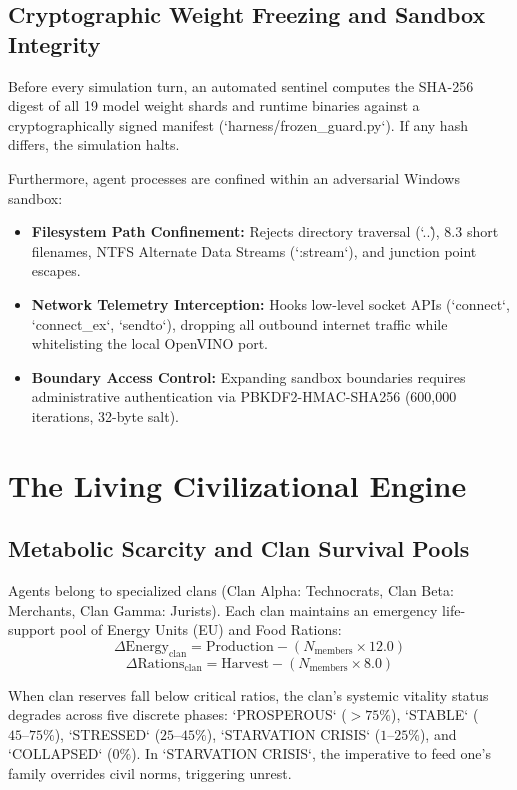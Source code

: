 \documentclass[11pt,a4paper]{article}
\begin{document}
\subsection{Cryptographic Weight Freezing and Sandbox Integrity}
Before every simulation turn, an automated sentinel computes the SHA-256 digest of all 19 model weight shards and runtime binaries against a cryptographically signed manifest (`harness/frozen_guard.py`). If any hash differs, the simulation halts. 

Furthermore, agent processes are confined within an adversarial Windows sandbox:
\begin{itemize}[leftmargin=*]
    \item \textbf{Filesystem Path Confinement:} Rejects directory traversal (`..\`), 8.3 short filenames, NTFS Alternate Data Streams (`:stream`), and junction point escapes.
    \item \textbf{Network Telemetry Interception:} Hooks low-level socket APIs (`connect`, `connect_ex`, `sendto`), dropping all outbound internet traffic while whitelisting the local OpenVINO port.
    \item \textbf{Boundary Access Control:} Expanding sandbox boundaries requires administrative authentication via PBKDF2-HMAC-SHA256 (600,000 iterations, 32-byte salt).
\end{itemize}

\section{The Living Civilizational Engine}
\label{sec:living_engine}

\subsection{Metabolic Scarcity and Clan Survival Pools}
Agents belong to specialized clans (Clan Alpha: Technocrats, Clan Beta: Merchants, Clan Gamma: Jurists). Each clan maintains an emergency life-support pool of Energy Units (EU) and Food Rations:
\begin{equation}
\Delta \text{Energy}_{\text{clan}} = \text{Production} - (N_{\text{members}} \times 12.0)
\end{equation}
\begin{equation}
\Delta \text{Rations}_{\text{clan}} = \text{Harvest} - (N_{\text{members}} \times 8.0)
\end{equation}

When clan reserves fall below critical ratios, the clan's systemic vitality status degrades across five discrete phases: `PROSPEROUS` ($>75\%$), `STABLE` ($45\text{--}75\%$), `STRESSED` ($25\text{--}45\%$), `STARVATION CRISIS` ($1\text{--}25\%$), and `COLLAPSED` ($0\%$). In `STARVATION CRISIS`, the imperative to feed one's family overrides civil norms, triggering unrest.
\end{document}
